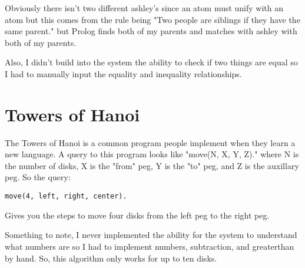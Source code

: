 \documentclass[a4paper, 12pt]{article}
\begin{document}
Obviously there isn't two different ashley's since an atom must unify with an atom but this comes from the rule being "Two people are siblings if they have the same parent." 
but Prolog finds both of my parents and matches with ashley with both of my parents.

Also, I didn't build into the system the ability to check if two things are equal so I had to manually input the equality and inequality relationships.

\section*{Towers of Hanoi}

The Towers of Hanoi is a common program people implement when they learn a new language.
A query to this program looks like "move(N, X, Y, Z)." where N is the number of disks, X is the "from" peg, Y is the "to" peg, and Z is the auxillary peg.
So the query:

\begin{verbatim}
move(4, left, right, center).
\end{verbatim}

Gives you the steps to move four disks from the left peg to the right peg.

Something to note, I never implemented the ability for the system to understand what numbers are so I had to implement numbers, subtraction, and greaterthan by hand.
So, this algorithm only works for up to ten disks.
\end{document}

